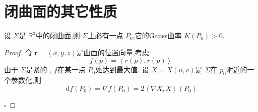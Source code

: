 \documentclass[../../main.tex]{subfiles}
\begin{document}
\section{闭曲面的其它性质}


\begin{theorem}
    设  \(   \Sigma   \)是 \(  \mathbb{R} ^{3}  \)中的闭曲面,则 \(   \Sigma   \)上必有一点 \(  P_0  \),它的Gauss曲率 \(  K\left( P_0 \right)> 0   \).     
\end{theorem}
\begin{proof}
    令 \(  \mathbf{r}= \left( x,y,z \right)   \)是曲面的位置向量,考虑 \[
    f\left( p \right)= \left<r\left( p \right),r\left( p \right)   \right> 
    \] 由于 \(   \Sigma   \)是紧的 , \(  f  \)在某一点 \(  P_0  \)处达到最大值. 设 \(  X= X\left( u,v \right)   \)是 \(   \Sigma   \)在 \(  p_0  \)附近的一个参数化,则 \[
    \,\mathrm{d} f\left( P_0 \right)=   \nabla f\left( P_0 \right)=2 \left< \nabla X,X \right>\left( P_0 \right) 
    \]      

    \hfill $\square$
\end{proof}
\end{document}
